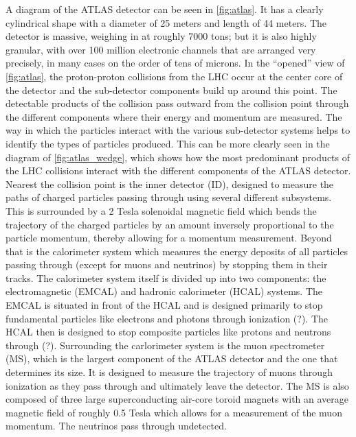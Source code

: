 A diagram of the ATLAS detector can be seen in \fig\ref{fig:atlas}.
It has a clearly cylindrical shape with a diameter of 25 meters
and length of 44 meters. The detector is massive, weighing
in at roughly 7000 tons; but it is also highly granular, with
over 100 million electronic channels that are arranged very precisely, 
in many cases on the order of tens of microns.
In the ``opened'' view of \fig\ref{fig:atlas}, the proton-proton
collisions from the LHC occur at the center core of the detector
and the sub-detector components build up around this point.
The detectable products of the collision pass outward from the collision
point through the different components where their energy and momentum
are measured. The way in which the particles interact with the various
sub-detector systems helps to identify the types of 
particles produced.
This can be more clearly seen in the diagram of 
\fig\ref{fig:atlas_wedge}, which shows how the most predominant
products of the LHC collisions interact with the different
components of the ATLAS detector.
Nearest the collision point is the inner detector (ID), designed to 
measure the paths of charged particles passing through using several
different subsystems. This 
is surrounded by a 2 Tesla solenoidal magnetic field which 
bends the trajectory of the charged particles by an amount
inversely proportional to the particle momentum, thereby allowing
for a momentum measurement.  Beyond that is the calorimeter system
which measures the energy deposits of all particles passing 
through (except for muons and neutrinos) by stopping them in their 
tracks. The calorimeter system 
itself is divided up into two components: the electromagnetic (EMCAL)
and hadronic calorimeter (HCAL) systems.
The EMCAL is situated in front of the HCAL and is designed
primarily to stop fundamental particles like electrons and photons
through ionization (?). The HCAL then is designed to stop
composite particles like protons and neutrons through (?).
Surrounding the carlorimeter system is the muon spectrometer (MS),
which is the largest component of the ATLAS detector and the one
that determines its size. It is designed to measure the 
trajectory of muons through ionization as they pass through
and ultimately leave the detector. The MS is also composed of 
three large superconducting air-core toroid magnets with an 
average magnetic field of roughly 0.5 Tesla which allows for
a measurement of the muon momentum. The neutrinos 
pass through undetected.

